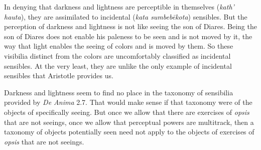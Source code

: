 In denying that darkness and lightness are perceptible in themselves (\emph{kath' hauta}), they are assimilated to incidental (\emph{kata sumbebēkota}) sensibles. But the perception of darkness and lightness is not like seeing the son of Diares. Being the son of Diares does not enable his paleness to be seen and is not moved by it, the way that light enables the seeing of colors and is moved by them. So these visibilia distinct from the colors are uncomfortably classified as incidental sensibles. At the very least, they are unlike the only example of incidental sensibles that Aristotle provides us.

Darkness and lightness seem to find no place in the taxonomy of sensibilia provided by \emph{De Anima} 2.7. That would make sense if that taxonomy were of the objects of specifically seeing. But once we allow that there are exercises of \emph{opsis} that are not seeings, once we allow that perceptual powers are multitrack, then a taxonomy of objects potentially seen need not apply to the objects of exercises of \emph{opsis} that are not seeings.

